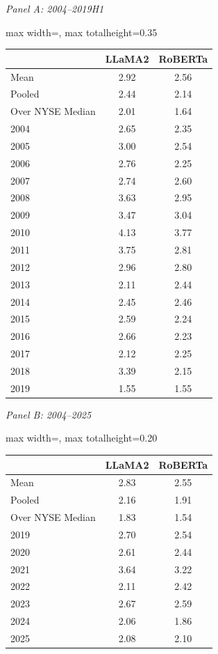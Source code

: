 \begin{table}[htbp]
{\footnotesize
\textit{Panel A: 2004--2019H1}\\[2pt]
\begin{adjustbox}{max width=\linewidth, max totalheight=0.35\textheight}
\begin{tabular}{lcc}
\toprule
 & LLaMA2 & RoBERTa \\
\midrule
Mean & 2.92 & 2.56 \\
Pooled & 2.44 & 2.14 \\
Over NYSE Median & 2.01 & 1.64 \\
2004 & 2.65 & 2.35 \\
2005 & 3.00 & 2.54 \\
2006 & 2.76 & 2.25 \\
2007 & 2.74 & 2.60 \\
2008 & 3.63 & 2.95 \\
2009 & 3.47 & 3.04 \\
2010 & 4.13 & 3.77 \\
2011 & 3.75 & 2.81 \\
2012 & 2.96 & 2.80 \\
2013 & 2.11 & 2.44 \\
2014 & 2.45 & 2.46 \\
2015 & 2.59 & 2.24 \\
2016 & 2.66 & 2.23 \\
2017 & 2.12 & 2.25 \\
2018 & 3.39 & 2.15 \\
2019 & 1.55 & 1.55 \\
\bottomrule
\end{tabular}
\end{adjustbox}
\par\medskip
\textit{Panel B: 2004--2025}\\[2pt]
\begin{adjustbox}{max width=\linewidth, max totalheight=0.20\textheight}
\begin{tabular}{lcc}
\toprule
 & LLaMA2 & RoBERTa \\
\midrule
Mean & 2.83 & 2.55 \\
Pooled & 2.16 & 1.91 \\
Over NYSE Median & 1.83 & 1.54 \\
2019 & 2.70 & 2.54 \\
2020 & 2.61 & 2.44 \\
2021 & 3.64 & 3.22 \\
2022 & 2.11 & 2.42 \\
2023 & 2.67 & 2.59 \\
2024 & 2.06 & 1.86 \\
2025 & 2.08 & 2.10 \\
\bottomrule
\end{tabular}
\end{adjustbox}
}
\end{table}
